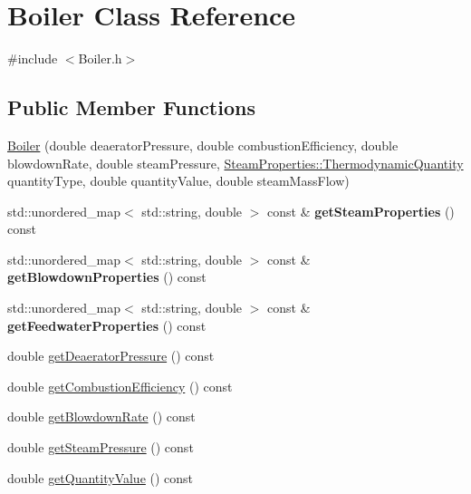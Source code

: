\hypertarget{class_boiler}{}\section{Boiler Class Reference}
\label{class_boiler}


{\ttfamily \#include $<$Boiler.\+h$>$}

\subsection*{Public Member Functions}
\begin{DoxyCompactItemize}
\item 
\hyperlink{class_boiler_adebe1dca06edc8dbca462e226b4dd9d5}{Boiler} (double deaerator\+Pressure, double combustion\+Efficiency, double blowdown\+Rate, double steam\+Pressure, \hyperlink{class_steam_properties_ae0294bedf7d178c2d8fb6aed0f62fbff}{Steam\+Properties\+::\+Thermodynamic\+Quantity} quantity\+Type, double quantity\+Value, double steam\+Mass\+Flow)
\item 
\mbox{\label{class_boiler_a432ff9b941a9fd3a36dc2c58bbb1fc60}} 
std\+::unordered\+\_\+map$<$ std\+::string, double $>$ const  \& {\bfseries get\+Steam\+Properties} () const
\item 
\mbox{\label{class_boiler_ac561af37c8c6d2f93cd4e38e8de9b8eb}} 
std\+::unordered\+\_\+map$<$ std\+::string, double $>$ const  \& {\bfseries get\+Blowdown\+Properties} () const
\item 
\mbox{\label{class_boiler_a7cf302e46f9128f7042928d51d094e50}} 
std\+::unordered\+\_\+map$<$ std\+::string, double $>$ const  \& {\bfseries get\+Feedwater\+Properties} () const
\item 
double \hyperlink{class_boiler_aad4786e7b68084e65a35dd6235517b8c}{get\+Deaerator\+Pressure} () const
\item 
double \hyperlink{class_boiler_a21c7423b756761c3216704b3f554feff}{get\+Combustion\+Efficiency} () const
\item 
double \hyperlink{class_boiler_aec9bf6eeed82d8d5f35284c65a3986e7}{get\+Blowdown\+Rate} () const
\item 
double \hyperlink{class_boiler_a99d4bbace6ef20bcbdc4b0cfcdc43213}{get\+Steam\+Pressure} () const
\item 
double \hyperlink{class_boiler_a78370a174135e6cc95abcd3b7ac2f947}{get\+Quantity\+Value} () const

\end{DoxyCompactItemize}
